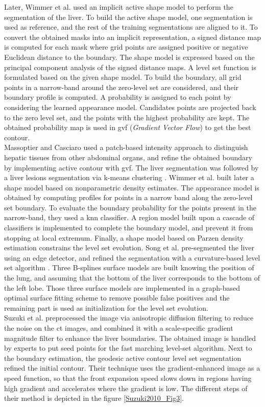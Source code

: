 Later, Wimmer et al. \cite{Wimmer2008} used an implicit active shape model to perform the
segmentation of the liver. To build the active shape model, one
segmentation is used as reference, and the rest of the training
segmentations are aligned to it. To convert the obtained masks into an
implicit representation, a signed distance map is computed for each mask
where grid points are assigned positive or negative Euclidean distance
to the boundary. The shape model is expressed based on the principal
component analysis of the signed distance maps. A level set function is
formulated based on the given shape model. To build the boundary, all
grid points in a narrow-band around the zero-level set are considered,
and their boundary profile is computed. A probability is assigned to
each point by considering the learned appearance model. Candidates
points are projected back to the zero level set, and the points with the
highest probability are kept. The obtained probability map is used in
\ac{gvf} (\emph{Gradient Vector Flow}) to get the best contour.\\
Massoptier and Casciaro \cite{Massoptier2008} used a patch-based intensity approach to distinguish
hepatic tissues from other abdominal organs, and refine the obtained
boundary by implementing active contour with \ac{gvf}. The liver segmentation
was followed by a liver lesions segmentation via k-means clustering \cite{Massoptier2008}. Wimmer et al. \cite{Wimmer2009} built later a shape model based on nonparametric density
estimates. The appearance model is obtained by computing profiles for
points in a narrow band along the zero-level set boundary. To evaluate
the boundary probability for the points present in the narrow-band, they
used a \ac{knn} classifier. A region model built upon a cascade of
classifiers is implemented to complete the boundary model, and prevent
it from stopping at local extremum. Finally, a shape model based on Parzen
density estimation constrains the level set evolution. Song et al. \cite{Song2009} pre-segmented the liver using an edge detector, and
refined the segmentation with a curvature-based level set algorithm .
Three B-splines surface models are built knowing the position of the
lung, and assuming that the bottom of the liver corresponds to the
bottom of the left lobe. Those three surface models are implemented in a
graph-based optimal surface fitting scheme to remove possible false
positives and the remaining part is used as initialization for the level
set evolution.\\
Suzuki et al. \cite{Suzuki2010} preprocessed the image via anisotropic diffusion
filtering to reduce the noise on the \ac{ct} images, and combined it with a
scale-specific gradient magnitude filter to enhance the liver
boundaries. The obtained image is handled by experts to put seed points
for the fast marching level-set algorithm. Next to the boundary
estimation, the geodesic active contour level set segmentation refined
the initial contour. Their technique uses the gradient-enhanced image as
a speed function, so that the front expansion speed slows down in
regions having high gradient and accelerates where the gradient is low.
The different steps of their method is depicted in the figure \ref{Suzuki2010_Fig3}.

